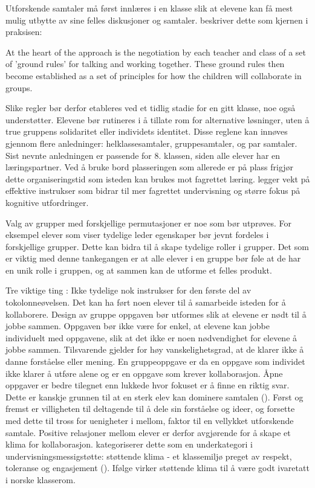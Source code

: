\documentclass[main.tex]{subfiles}
\begin{document}
Utforskende samtaler må først innlæres i en klasse slik at elevene kan få mest mulig
utbytte av sine felles diskusjoner og samtaler.  beskriver dette som kjernen i 
praksisen:
\begin{displayquote}
At the heart of the approach is the negotiation by each teacher and class of a set of 'ground
rules' for talking and working together. These ground rules then become established as a set of 
principles for how the children will collaborate in groups.
\end{displayquote}
Slike regler bør derfor etableres ved et tidlig stadie for en gitt klasse, noe 
også understøtter. Elevene bør rutineres i å tillate rom for alternative løsninger, uten å true 
gruppens solidaritet eller individets identitet. Disse reglene kan innøves gjennom flere 
anledninger: helklassesamtaler, gruppesamtaler, og par samtaler. Sist nevnte anledningen er passende
for 8. klassen, siden alle elever har en læringspartner. Ved å bruke bord plasseringen som allerede 
er på plass frigjør dette organiseringstid som isteden kan brukes mot fagrettet læring. 
 legger vekt på effektive instrukser som bidrar til mer fagrettet undervisning og 
større fokus på kognitive utfordringer.

Valg av grupper med forskjellige permutasjoner er noe som bør utprøves. For eksempel elever
som viser tydelige leder egenskaper bør jevnt fordeles i forskjellige grupper. Dette kan bidra til
å skape tydelige roller i grupper. Det som er viktig med denne tankegangen er at alle elever
i en gruppe bør føle at de har en unik rolle i gruppen, og at sammen kan de utforme et felles
produkt.

Tre viktige ting : Ikke tydelige nok instrukser for den første del av tokolonneøvelsen. 
Det kan ha ført noen elever til å samarbeide isteden for å kollaborere. Design av 
gruppe oppgaven bør utformes slik at elevene er nødt til å jobbe sammen. Oppgaven
bør ikke være for enkel, at elevene kan jobbe individuelt med oppgavene, slik at
det ikke er noen nødvendighet for elevene å jobbe sammen. Tilsvarende gjelder for høy
vanskelighetsgrad, at de klarer ikke å danne forståelse eller mening. En gruppeoppgave
er da en oppgave som individet ikke klarer å utføre alene og er en oppgave som krever
kollaborasjon.  Åpne oppgaver er bedre tilegnet enn lukkede hvor fokuset er å finne 
en riktig svar. Dette er kanskje grunnen til at en sterk elev kan dominere samtalen 
(). Først og fremst er villigheten til deltagende til å dele
sin forståelse og ideer, og forsette med dette til tross for uenigheter i mellom,
faktor til en vellykket utforskende samtale. Positive relasjoner mellom elever
er derfor avgjørende for å skape et klima for kollaborasjon. 
kategoriserer dette som en underkategori i undervisningsmessigstøtte: støttende
klima - et klassemiljø preget av respekt, toleranse og engasjement (). 
Ifølge  virker støttende klima til å være godt 
ivaretatt i norske klasserom.
\end{document}
